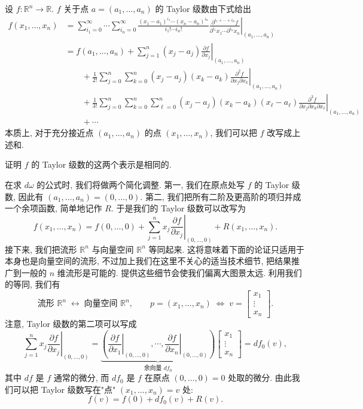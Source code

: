 设 $f:\mathbb{R}^n\to\mathbb{R}$. $f$ 关于点 $a=(a_1,\ldots,a_n)$ 的 Taylor 级数由下式给出
\begin{align*}
f(x_1,\ldots,x_n)&=\sum_{i_1=0}^{\infty}\cdots\sum_{i_n=0}^{\infty}
\frac{(x_1-a_1)^{i_1}\cdots(x_n-a_n)^{i_n}}{i_1!\cdots i_n!}
\left.\frac{\partial^{i_1+\cdots+i_n}f}{\partial^{i_1}x_1\cdots\partial^{i_n}x_n}\right|_{(a_1,\ldots,a_n)}\\
&=f(a_1,\ldots,a_n)+\sum_{j=1}^{n}(x_j-a_j)\left.\frac{\partial f}{\partial x_j}\right|_{(a_1,\ldots,a_n)}\\
&\qquad+\frac{1}{2!}\sum_{j=0}^{n}\sum_{k=0}^{n}(x_j-a_j)(x_k-a_k)
\left.\frac{\partial^2 f}{\partial x_j\partial x_k}\right|_{(a_1,\ldots,a_n)}\\
&\qquad+\frac{1}{3!}\sum_{j=0}^{n}\sum_{k=0}^{n}\sum_{\ell=0}^{n}(x_j-a_j)(x_k-a_k)(x_\ell-a_\ell)
\left.\frac{\partial^3 f}{\partial x_j\partial x_k\partial x_\ell}\right|_{(a_1,\ldots,a_n)}\\
&\qquad+\cdots
\end{align*}
本质上, 对于充分接近点 $(a_1,\ldots,a_n)$ 的点 $(x_1,\ldots,x_n)$, 我们可以把 $f$ 改写成上述和.

\begin{question}\label{q:4-6}
证明 $f$ 的 Taylor 级数的这两个表示是相同的.
\end{question}

在求 $d\omega$ 的公式时, 我们将做两个简化调整. 第一, 我们在原点处写 $f$ 的 Taylor 级数, 因此有 $(a_1,\ldots,a_n)=(0,\ldots,0)$. 第二, 我们把所有二阶及更高阶的项归并成一个余项函数, 简单地记作 $R$. 于是我们的 Taylor 级数可以改写为
\[
f(x_1,\ldots,x_n)=f(0,\ldots,0)+\sum_{j=1}^{n}x_j\left.\frac{\partial f}{\partial x_j}\right|_{(0,\ldots,0)}+R(x_1,\ldots,x_n).
\]
接下来, 我们把流形 $\mathbb{R}^n$ 与向量空间 $\mathbb{R}^n$ 等同起来. 这将意味着下面的论证只适用于本身也是向量空间的流形, 不过加上我们在这里不关心的适当技术细节, 把结果推广到一般的 $n$ 维流形是可能的. 提供这些细节会使我们偏离大图景太远. 利用我们的等同, 我们有
\[
\text{流形 }\mathbb{R}^n\;\longleftrightarrow\;\text{向量空间 }\mathbb{R}^n,\qquad
p=(x_1,\ldots,x_n)\;\Longleftrightarrow\;v=\begin{bmatrix}x_1\\\vdots\\x_n\end{bmatrix}.
\]
注意, Taylor 级数的第二项可以写成
\[
\sum_{j=1}^{n}x_j\left.\frac{\partial f}{\partial x_j}\right|_{(0,\ldots,0)}
=\underbrace{\left(\left.\frac{\partial f}{\partial x_1}\right|_{(0,\ldots,0)},\cdots,
\left.\frac{\partial f}{\partial x_n}\right|_{(0,\ldots,0)}\right)}_{\text{余向量 }df_0}
\begin{bmatrix}x_1\\\vdots\\x_n\end{bmatrix}
=df_0(v),
\]
其中 $df$ 是 $f$ 通常的微分, 而 $df_0$ 是 $f$ 在原点 $(0,\ldots,0)=0$ 处取的微分. 由此我们可以把 Taylor 级数写在"点" $(x_1,\ldots,x_n)=v$ 处: 
\[
f(v)=f(0)+df_0(v)+R(v).
\]

